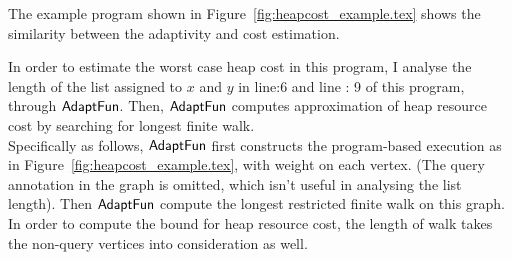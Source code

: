 \begin{example}
  \label{ex:heapcost}
The example program shown in Figure~\ref{fig:heapcost_example.tex} shows the similarity
between the adaptivity and cost estimation.

In order to estimate the worst case heap cost in this program, I analyse the length 
of the list assigned to $x$ and $y$ in line:6 and line : 9 of this program, through $\textsf{AdaptFun}$.
Then,  $\textsf{AdaptFun}$ computes approximation
of heap resource cost by searching for longest finite walk.
\\
Specifically as follows, 
$\textsf{AdaptFun}$ first constructs the program-based execution as in Figure~\ref{fig:heapcost_example.tex},
with weight on each vertex. (The query annotation in the graph is omitted, which isn't useful in analysing the 
list length).
Then $\textsf{AdaptFun}$ compute the longest restricted finite walk on this graph.
\\
In order to compute the bound for heap resource cost, the length of walk takes the non-query vertices into consideration as 
well. 


\end{example}
